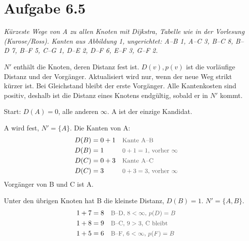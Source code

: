\documentclass[a4paper,11pt]{article}
\newif\ifexplain
\newcommand{\aufgabe}[1]{\section*{Aufgabe #1}}
\newcommand{\angabe}[1]{{\raggedright\textit{#1}\par}\smallskip}
\newcommand{\why}[1]{\text{\small\color{black!65}#1}}
\newcommand{\explainfig}[1]{\ifexplain\begin{center}#1\end{center}\fi}
\begin{document}
\aufgabe{6.5}
\angabe{Kürzeste Wege von A zu allen Knoten mit Dijkstra, Tabelle wie in der Vorlesung (Kurose/Ross). Kanten aus Abbildung 1, ungerichtet: A--B 1, A--C 3, B--C 8, B--D 7, B--F 5, C--G 1, D--E 2, D--F 6, E--F 3, G--F 2.}
\explainfig{%
\begin{tikzpicture}[every node/.style={circle,draw,minimum size=7mm,inner sep=0pt},scale=1.05]
  \node (A) at (0,2) {A};
  \node (B) at (1.3,0.7) {B};
  \node (C) at (0,-0.8) {C};
  \node (D) at (2.8,2) {D};
  \node (E) at (4.2,0.7) {E};
  \node (F) at (2.8,-0.8) {F};
  \node (G) at (1.3,-0.8) {G};
  \draw (A) -- node[draw=none,fill=white,inner sep=1pt] {1} (B);
  \draw (A) -- node[draw=none,fill=white,inner sep=1pt] {3} (C);
  \draw (B) -- node[draw=none,fill=white,inner sep=1pt] {8} (C);
  \draw (B) -- node[draw=none,fill=white,inner sep=1pt] {7} (D);
  \draw (B) -- node[draw=none,fill=white,inner sep=1pt] {5} (F);
  \draw (C) -- node[draw=none,fill=white,inner sep=1pt] {1} (G);
  \draw (D) -- node[draw=none,fill=white,inner sep=1pt] {2} (E);
  \draw (D) -- node[draw=none,fill=white,inner sep=1pt] {6} (F);
  \draw (E) -- node[draw=none,fill=white,inner sep=1pt] {3} (F);
  \draw (G) -- node[draw=none,fill=white,inner sep=1pt] {2} (F);
\end{tikzpicture}}
\(N'\) enthält die Knoten, deren Distanz fest ist. \(D(v),p(v)\) ist die vorläufige Distanz und der Vorgänger. Aktualisiert wird nur, wenn der neue Weg strikt kürzer ist. Bei Gleichstand bleibt der erste Vorgänger. Alle Kantenkosten sind positiv, deshalb ist die Distanz eines Knotens endgültig, sobald er in \(N'\) kommt.

Start: \(D(A)=0\), alle anderen \(\infty\). A ist der einzige Kandidat.

A wird fest, \(N'=\{A\}\). Die Kanten von A:
\begin{align*}
D(B) &= 0+1 && \why{Kante A--B}\\
D(B) &= 1 && \why{$0+1=1$, vorher $\infty$}\\
D(C) &= 0+3 && \why{Kante A--C}\\
D(C) &= 3 && \why{$0+3=3$, vorher $\infty$}
\end{align*}
Vorgänger von B und C ist A.

Unter den übrigen Knoten hat B die kleinste Distanz, \(D(B)=1\). \(N'=\{A,B\}\).
\begin{align*}
1+7 &= 8 && \why{B--D, $8<\infty$, $p(D)=B$}\\
1+8 &= 9 && \why{B--C, $9>3$, C bleibt}\\
1+5 &= 6 && \why{B--F, $6<\infty$, $p(F)=B$}
\end{align*}
\end{document}
